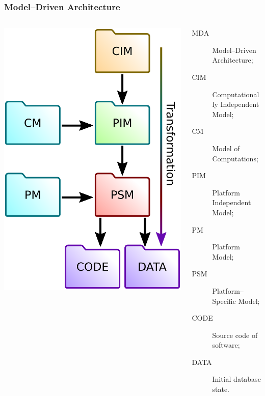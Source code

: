 \documentclass[10pt]{beamer}
\begin{document}
\begin{frame}[fragile]
  \frametitle{Model--Driven Architecture}

  \begin{columns}
    \begin{column}{0.4\textwidth}
      \includegraphics[width=1\linewidth]{mda-most-general.pdf}
    \end{column}
    \begin{column}{0.7\linewidth}
      \begin{description}
      \item[MDA] Model--Driven Architecture;
      \item[CIM] Computationally Independent Model;
      \item[CM] Model of Computations;
      \item[PIM] Platform Independent Model;
      \item[PM] Platform Model;
      \item[PSM] Platform--Specific Model;
      \item[CODE] Source code of software;
      \item[DATA] Initial database state.
      \end{description}
    \end{column}
  \end{columns}
\end{frame}
\end{document}

